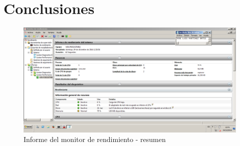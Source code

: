 \section{Conclusiones}

\begin{figure}[H] %
\centering
\includegraphics[scale=0.4]{./imagenes/P3_4_1.png} 
\caption{Informe del monitor de rendimiento - resumen} \label{fig:P3_4_1}
\end{figure}










